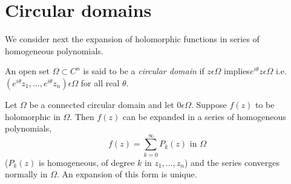 \section{Circular domains}\label{chap2:sec3}
We consider next the expansion of holomorphic functions in series of
homogeneous polynomials. 

\begin{defi*}
An open set $\Omega \subset C^n$ is said to be a \textit{circular
  domain} if $z \epsilon \Omega$ implies\pageoriginale $e^{i\theta} z\epsilon
\Omega$ i.e. $(e^{i\theta} z_1 , \ldots, e^{i\theta} z_n) \epsilon \Omega$
for all real $\theta$.
\end{defi*}

\begin{thm}\label{chap2:thm3}
Let $\Omega$ be a connected circular domain and let $0
\epsilon\Omega$. Suppose $f(z)$ to be holomorphic in $\Omega$. Then $f(z)$
can be expanded in a series of homogeneous polynomials,
$$
f(z) = \sum\limits^\infty_{k=0} P_k (z) \text{ in } \Omega
$$
($P_k(z)$ is homogeneous, of degree $k$ in $z_1, \ldots, z_n$) and the
series converges normally in $\Omega$. An expansion of this form is
unique. 
\end{thm}

